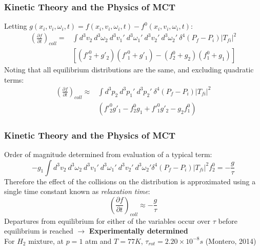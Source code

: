 \documentclass{beamer}
\begin{document}
\begin{frame}
 \frametitle{Kinetic Theory and the Physics of MCT}
Letting $g(x_i, v_i, \omega_i, t) = f(x_i, v_i, \omega_i, t) - f^{0}(x_i, v_i, 
\omega_i, t)$:
 \begin{equation*}
 \begin{split}
(\frac{\partial f}{\partial t})_{coll} = &\int d^3 v_2 \ d^3\omega_2 \ d^3v_1' 
\ d^3 \omega_1' \ d^3v_2' \ d^3\omega_2' \ \delta^4(P_f - 
P_i)\left|T_{fi}\right|^2\\  &[(f'^{0}_2 + g'_2)(f'^{0}_1 + g'_1) - (f^{0}_2 + 
g_2)(f^{0}_1 + g_1)]
\end{split}
 \end{equation*}
Noting that all equilibrium distributions are the same, and excluding quadratic 
terms:
\begin{equation*}
\begin{split}
 (\frac{\partial f}{\partial t})_{coll} \approx &\int d^3 p_2 \ d^3p_1' \ 
d^3p_2' \ \delta^4(P_f - P_i)\left|T_{fi}\right|^2\\  & (f'^{0}_2g'_1 - 
f^{0}_2g_1 + f'^{0}_1g'_2 - g_2 f^{0}_1)
 \end{split}
\end{equation*}
\end{frame}

\begin{frame}
 \frametitle{Kinetic Theory and the Physics of MCT}
 Order of magnitude determined from evaluation of a typical term:
\begin{equation*}
 -g_1 \int d^3 v_2 \ d^3\omega_2 \ d^3 v_1' \ d^3 \omega_1' \ 
d^3v_2' \ d^3\omega_2' \delta^4(P_f - P_i)\left|T_{fi}\right|^2 f_2^{0} = 
-\frac{g}{\tau}
\end{equation*}
 \large 
Therefore the effect of the collisions on the distribution is approximated 
using a single time constant known as \textit{relaxation time}:
\begin{equation*}
(\frac{\partial f}{\partial t})_{coll} \approx - \frac{g}{\tau} 
\end{equation*}
Departures from equilibrium for either of the variables occur over $\tau$ 
before equilibrium is reached \pause $\rightarrow$ \textbf{Experimentally 
determined} \\
\pause
\vspace{2mm}
For $H_2$ mixture, at $p = 1$ atm and $T= 77K$, $\tau_{rot} = 2.20 
\times 10^{-8}s$ (Montero, 2014)
\end{frame}
\end{document}
